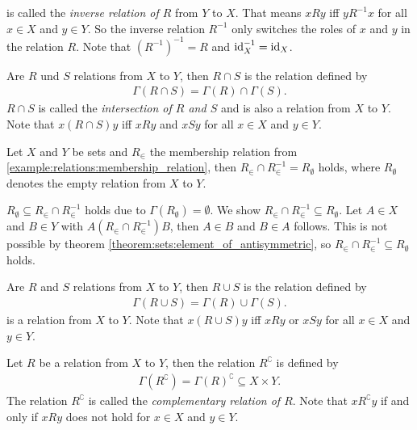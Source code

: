 \begin{examples}
\begin{exampleenumerate}
        is called the \emph{inverse relation of $R$} from $Y$ to $X$. That means $xRy$ iff $yR^{-1}x$ for all $x\in X$ and $y\in Y$. So the inverse relation $R^{-1}$ only switches the roles of $x$ and $y$ in the relation $R$. Note that $(R^{-1})^{-1}=R$ and $\text{id}_X^{-1}=\text{id}_X$. %
        \item Are $R$ und $S$ relations from $X$ to $Y$, then $R\cap S$ is the relation defined by
        \begin{align}\Gamma(R\cap S)=\Gamma(R)\cap\Gamma(S).\end{align}
        $R\cap S$ is called the \emph{intersection of $R$ and $S$} and is also a relation from $X$ to $Y$. Note that $x(R\cap S)y$ iff $xRy$ and $xSy$ for all $x\in X$ and $y\in Y$.
        \item Let $X$ and $Y$ be sets and $R_\in$ the membership relation from \ref{example:relations:membership_relation}, then $R_\in\cap R_\in^{-1}=R_\emptyset$ holds, where $R_\emptyset$ denotes the empty relation from $X$ to $Y$.
        \begin{miniproof}
            $R_\emptyset\subseteq R_\in\cap R_\in^{-1}$ holds due to $\Gamma(R_\emptyset)=\emptyset$. We show $R_\in\cap R_\in^{-1}\subseteq R_\emptyset$. Let $A\in X$ and $B\in Y$ with $A (R_\in\cap R_\in^{ -1}) B$, then $A\in B$ and $B\in A$ follows. This is not possible by theorem \ref{theorem:sets:element_of_antisymmetric}, so $R_\in\cap R_\in^{-1}\subseteq R_\emptyset$ holds.
        \end{miniproof}
        \item Are $R$ and $S$ relations from $X$ to $Y$, then $R\cup S$ is the relation defined by
        \begin{align}\Gamma(R\cup S)=\Gamma(R)\cup\Gamma(S).\end{align}
        is a relation from $X$ to $Y$. Note that $x(R\cup S)y$ iff $xRy$ or $xSy$ for all $x\in X$ and $y\in Y$.
        \item Let $R$ be a relation from $X$ to $Y$, then the relation $R^\complement$ is defined by \begin{align}\Gamma(R^\complement)=\Gamma(R)^\complement\subseteq X\times Y.\end{align}
        The relation $R^\complement$ is called the \emph{complementary relation of $R$}. Note that $x R^\complement y$ if and only if $xRy$ does not hold for $x\in X$ and $y\in Y$. 
    \end{exampleenumerate}
\end{examples}


